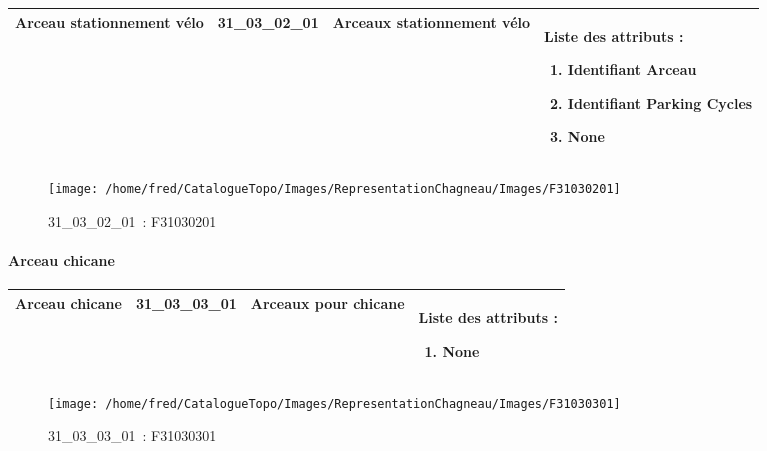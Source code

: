 \documentclass[12pt,titlepage,oneside]{book}
\begin{document}
\renewcommand{\arraystretch}{1.2}
\begin{supertabular}{|p{10cm}|c|p{13cm}|p{12cm}|}
 Arceau stationnement vélo & 31\_03\_02\_01 & Arceaux stationnement vélo & Liste des attributs :
\begin{enumerate}
  \item Identifiant Arceau  \item Identifiant Parking Cycles  \item None\end{enumerate}
\\
\hline
\end{supertabular}
\begin{figure}[h!]
  \hfill         %
  \begin{minipage}[t]{3cm}
    \begin{center}
      \texttt{[image: /home/fred/CatalogueTopo/Images/RepresentationChagneau/Images/F31030201]}
      \caption[~31\_03\_02\_01]{\small{31\_03\_02\_01~:} \tiny{F31030201}}\label{F31030201}
    \end{center}
  \end{minipage}
\end{figure}


\paragraph{Arceau chicane}
\noindent
\vspace{\baselineskip}

\renewcommand{\arraystretch}{1.2}
\begin{supertabular}{|p{10cm}|c|p{13cm}|p{12cm}|}
 Arceau chicane & 31\_03\_03\_01 & Arceaux pour chicane & Liste des attributs :
\begin{enumerate}
  \item None\end{enumerate}
\\
\hline
\end{supertabular}
\begin{figure}[h!]
  \hfill         %
  \begin{minipage}[t]{3cm}
    \begin{center}
      \texttt{[image: /home/fred/CatalogueTopo/Images/RepresentationChagneau/Images/F31030301]}
      \caption[~31\_03\_03\_01]{\small{31\_03\_03\_01~:} \tiny{F31030301}}\label{F31030301}
    \end{center}
  \end{minipage}
\end{figure}
\end{document}
